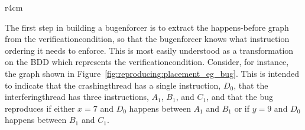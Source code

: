 \begin{wrapfigure}{r}{4cm}
  \vspace{-5mm}
  \vspace{-10mm}
  \caption{}
  \vspace{-5mm}
  \label{fig:reproducing:placement_eg_bug}
\end{wrapfigure}
The first step in building a \gls{bugenforcer} is to extract the
happens-before graph from the \gls{verificationcondition}, so that the
\gls{bugenforcer} knows what instruction ordering it needs to enforce.
This is most easily understood as a transformation on the BDD which
represents the \gls{verificationcondition}.  Consider, for instance,
the graph shown in Figure~\ref{fig:reproducing:placement_eg_bug}.
This is intended to indicate that the \gls{crashingthread} has a
single instruction, $D_0$, that the \gls{interferingthread} has three
instructions, $A_1$, $B_1$, and $C_1$, and that the bug reproduces if
either $x = 7$ and $D_0$ happens between $A_1$ and $B_1$ or if $y = 9$
and $D_0$ happens between $B_1$ and $C_1$.

